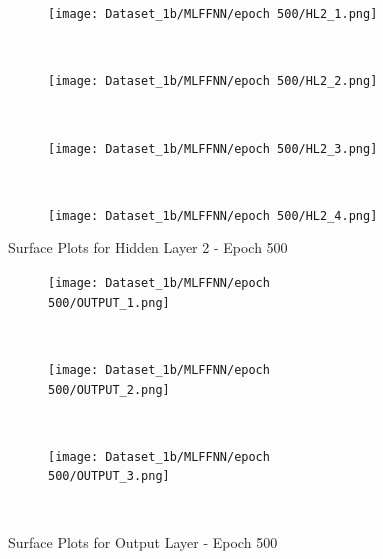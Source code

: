 \begin{figure}[!ht]
    \centering
    \begin{subfigure}[h]{0.5\textwidth}
        \centering
        \texttt{[image: Dataset\_1b/MLFFNN/epoch 500/HL2\_1.png]}
    \end{subfigure}%
    ~ 
    \begin{subfigure}[h]{0.5\textwidth}
        \centering
        \texttt{[image: Dataset\_1b/MLFFNN/epoch 500/HL2\_2.png]}
    \end{subfigure}%
    ~
    
    \begin{subfigure}[h]{0.4\textwidth}
        \centering
        \texttt{[image: Dataset\_1b/MLFFNN/epoch 500/HL2\_3.png]}
    \end{subfigure}
    ~
    \begin{subfigure}[h]{0.4\textwidth}
        \centering
        \texttt{[image: Dataset\_1b/MLFFNN/epoch 500/HL2\_4.png]}
    \end{subfigure}
    \caption{Surface Plots for Hidden Layer 2 - Epoch 500}
    \label{fig:13}
\end{figure}

\newpage

\begin{figure}[!ht]
    \centering
    \begin{subfigure}[h]{0.5\textwidth}
        \centering
        \texttt{[image: Dataset\_1b/MLFFNN/epoch 500/OUTPUT\_1.png]}
    \end{subfigure}%
    ~ 
    \begin{subfigure}[h]{0.5\textwidth}
        \centering
        \texttt{[image: Dataset\_1b/MLFFNN/epoch 500/OUTPUT\_2.png]}
    \end{subfigure}%
    ~
    
    \begin{subfigure}[h]{0.4\textwidth}
        \centering
        \texttt{[image: Dataset\_1b/MLFFNN/epoch 500/OUTPUT\_3.png]}
    \end{subfigure}
    ~
    \caption{Surface Plots for Output Layer - Epoch 500}
    \label{fig:13}
\end{figure}



